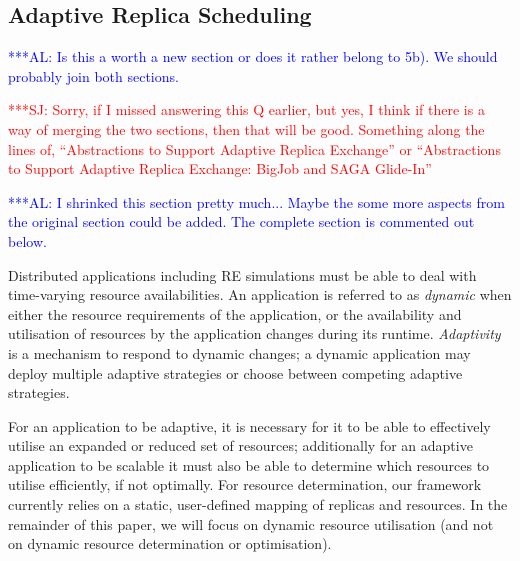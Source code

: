 \documentclass{rspublic}
\newcommand{\alnote}[1]{ {\textcolor{blue} { ***AL: #1 }}}
\newcommand{\jhanote}[1]{ {\textcolor{red} { ***SJ: #1 }}}
\newcommand{\alnote}[1]{}
\newcommand{\jhanote}[1]{}
\begin{document}
\subsection{Adaptive Replica Scheduling}
\label{sec:adaptivitiy}    
\alnote{Is this a worth a new section or does it rather belong to
  5b). We should probably join both sections.}  

\jhanote{Sorry, if I missed answering this Q earlier, but yes, I think
  if there is a way of merging the two sections, then that will be
  good. Something along the lines of, ``Abstractions to Support
  Adaptive Replica Exchange'' or ``Abstractions to Support Adaptive
  Replica Exchange: BigJob and SAGA Glide-In''}

\alnote{I shrinked this section pretty much... Maybe the some more
    aspects from the original section could be added. The complete
    section is commented out below.}

Distributed applications including RE simulations must be able to 
deal with time-varying resource availabilities.
An application is referred to as \emph{dynamic} when either the
resource requirements of the application, or the availability and
utilisation of resources by the application changes during its
runtime.  \emph{Adaptivity} is a mechanism to respond to dynamic
changes; %
a dynamic application may deploy multiple adaptive strategies or
choose between competing adaptive strategies.

For an application to be adaptive, it is necessary for it to be able
to effectively utilise an expanded or reduced set of resources;
additionally for an adaptive application to be scalable it must also
be able to determine which resources to utilise efficiently, if not
optimally.  For resource determination, our framework currently relies
on a static, user-defined mapping of replicas and resources.  In the
remainder of this paper, we will focus on dynamic resource utilisation
(and not on dynamic resource determination or optimisation).


\end{document}
